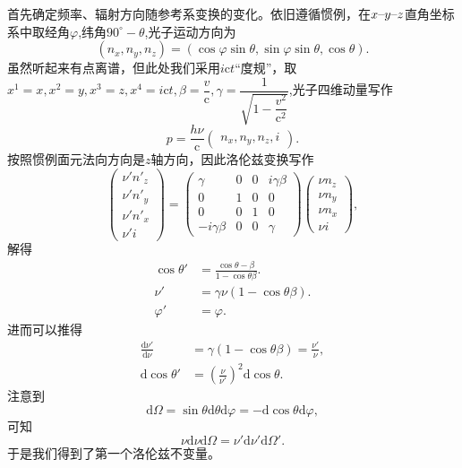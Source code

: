 \documentclass[../天体物理基础.tex]{subfiles}
\begin{document}
首先确定频率、辐射方向随参考系变换的变化。依旧遵循惯例，在$x\text{\textendash}y\text{\textendash}z$直角坐标系中取经角$\varphi$,纬角$90^{\circ}-\theta$,光子运动方向为
\begin{equation}
\left(n_x,n_y,n_z\right)=\left(\cos\varphi\sin\theta,\sin\varphi\sin\theta,\cos\theta\right).
\end{equation}
虽然听起来有点离谱，但此处我们采用$i\mathrm{c}t$“度规”，取$x^{1}=x,x^{2}=y,x^{3}=z,x^{4}=i\mathrm{c}t,\beta=\dfrac{v}{\mathrm{c}},\gamma=\dfrac{1}{\sqrt{1-\dfrac{v^2}{\mathrm{c}^2}}}$,光子四维动量写作
\begin{equation}
p=\frac{h\nu}{\mathrm{c}}
\begin{pmatrix}
n_x,n_y,n_z,i
\end{pmatrix}.
\end{equation}
按照惯例面元法向方向是$z$轴方向，因此洛伦兹变换写作
\begin{equation}
\begin{pmatrix}
\nu' n'_z\\\nu' n'_y\\\nu' n'_x\\\nu' i
\end{pmatrix}=
\begin{pmatrix}
\gamma & 0 & 0 & i\gamma\beta\\
0 & 1 & 0 & 0\\
0 & 0 & 1 & 0\\
-i\gamma\beta & 0 & 0 &\gamma
\end{pmatrix}
\begin{pmatrix}
\nu n_z\\\nu n_y\\\nu n_x\\\nu i
\end{pmatrix},
\end{equation}
解得
\begin{align}
\cos\theta'&=\frac{\cos\theta-\beta}{1-\cos\theta\beta}.\\
\nu'&=\gamma\nu\left(1-\cos\theta\beta\right).\\
\varphi'&=\varphi.
\end{align}
进而可以推得
\begin{align}
\frac{\mathrm{d}\nu'}{\mathrm{d}\nu}&=\gamma\left(1-\cos\theta\beta\right)=\frac{\nu'}{\nu},\\
\mathrm{d}\cos\theta'&=\left(\frac{\nu}{\nu'}\right)^2\mathrm{d}\cos\theta.
\end{align}
注意到
\begin{equation}
\mathrm{d}\Omega=\sin\theta\mathrm{d}\theta\mathrm{d}\varphi=-\mathrm{d}\cos\theta\mathrm{d}\varphi,
\end{equation}
可知
\begin{equation}
\nu\mathrm{d}\nu\mathrm{d}\Omega=\nu'\mathrm{d}\nu'\mathrm{d}\Omega'.
\end{equation}
于是我们得到了第一个洛伦兹不变量。
\end{document}
